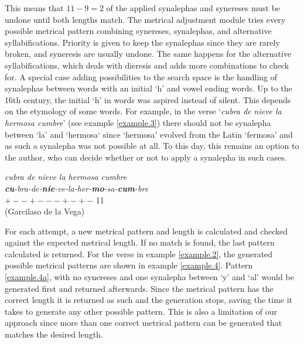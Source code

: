 \documentclass[a4paper,11pt,twocolumn,twoside]{article}
\begin{document}
This means that $11 - 9 = 2$ of the applied synalephas and synereses must be undone until both lengths match. The metrical adjustment module tries every possible metrical pattern combining synereses, synalephas, and alternative syllabifications. Priority is given to keep the synalephas since they are rarely broken, and syneresis are usually undone. The same happens for the alternative syllabifications, which deals with dieresis and adds more combinations to check for. A special case adding possibilities to the search space is the handling of synalephas between words with an initial `h' and vowel ending words.
Up to the 16th century, the initial `h' in words was aspired instead of silent. This depends on the etymology of some words. For example, in the verse `\textit{cubra de nieve la hermosa cumbre}' (see example \ref{example.3}) there should not be synalepha between `la' and `hermosa` since `hermosa' evolved from the Latin `fermosa' and as such a synalepha was not possible at all. To this day, this remains an option to the author, who can decide whether or not to apply a synalepha in such cases.

\begin{example}\label{example.3}
\textit{cubra de nieve la hermosa cumbre}\\
\textit{\textbf{cu}-bra-de-\textbf{nie}-ve-la-her-\textbf{mo}-sa-\textbf{cum}-bre} \\
$+--+---+-+-$ 11 \\
(Garcilaso de la Vega) \\
\end{example}

For each attempt, a new metrical pattern and length is calculated and checked against the expected metrical length. If no match is found, the last pattern calculated is returned. For the verse in example \ref{example.2}, the generated possible metrical patterns are shown in example \ref{example.4}. Pattern \ref{example.4a}, with no synereses and one synalepha between `y' and `al' would be generated first and returned afterwards. Since the metrical pattern has the correct length it is returned as such and the generation stops, saving the time it takes to generate any other possible pattern. This is also a limitation of our approach since more than one correct metrical pattern can be generated that matches the desired length.
\end{document}
